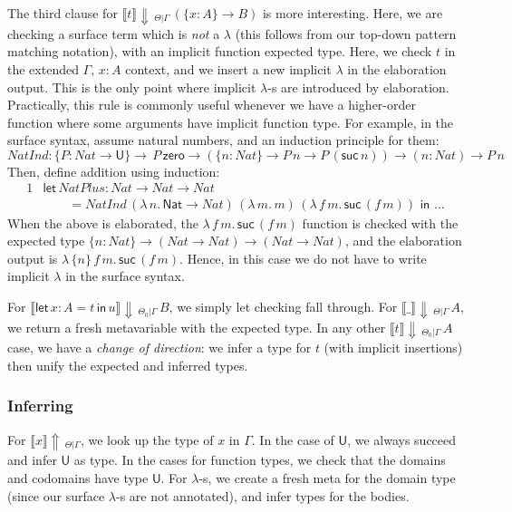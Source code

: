 \documentclass[acmsmall,review,anonymous,prologue,dvipsnames]{acmart}\settopmatter{printfolios=true,printccs=false,printacmref=false}
\newcommand{\slet}{\boldsymbol{\mathsf{let}}}
\renewcommand{\sin}{\boldsymbol{\mathsf{in}}}
\renewcommand{\U}{\mathsf{U}}
\newcommand{\echeck}[4]{\llbracket#1\rrbracket\!\Downarrow\,_{#2|#3}\,#4}
\newcommand{\einfer}[3]{\llbracket#1\rrbracket\!\Uparrow\,_{#2|#3}}
\newcommand{\Nat}{\mathsf{Nat}}
\newcommand{\zero}{\mathsf{zero}}
\newcommand{\suc}{\mathsf{suc}}
\theoremstyle{remark}
\begin{document}
The third clause for $\echeck{t}{\Theta}{\Gamma}{(\{x : A\}\to B)}$ is more
interesting. Here, we are checking a surface term which is \emph{not} a
$\lambda$ (this follows from our top-down pattern matching notation), with an
implicit function expected type. Here, we check $t$ in the extended $\Gamma,\,x
: A$ context, and we insert a new implicit $\lambda$ in the elaboration
output. This is the only point where implicit $\lambda$-s are introduced by
elaboration. Practically, this rule is commonly useful whenever we have a
higher-order function where some arguments have implicit function type. For
example, in the surface syntax, assume natural numbers, and an induction
principle for them:
\[
NatInd : \{P : Nat \to \U\}\to \,P\,\zero \to (\{n : Nat\}\to P\,n \to
         P\,(\suc\,n)) \to (n : Nat) \to P\,n
\]
Then, define addition using induction:
\begin{alignat*}{1}
& \slet\, NatPlus : Nat \to Nat \to Nat\\
& \qquad = NatInd\,(\lambda\,n.\,\Nat\to Nat)\,(\lambda\,m.\,m)\,
                        (\lambda\,f\,m.\,\suc\,(f\,m))\,\,\sin\,\,...
\end{alignat*}
When the above is elaborated, the $\lambda\,f\,m.\,\suc\,(f\,m)$ function is
checked with the expected type $\{n : Nat\}\to (Nat \to Nat) \to (Nat \to Nat)$,
and the elaboration output is $\lambda\,\{n\}\,f\,m.\,\suc\,(f\,m)$.  Hence, in
this case we do not have to write implicit $\lambda$ in the surface syntax.

For $\echeck{\slet\,x:A=t\,\sin\,u}{\Theta_0}{\Gamma}{B}$, we simply let
checking fall through. For $\echeck{\_}{\Theta}{\Gamma}{A}$, we return a fresh
metavariable with the expected type. In any other
$\echeck{t}{\Theta_0}{\Gamma}{A}$ case, we have a \emph{change of direction}: we
infer a type for $t$ (with implicit insertions) then unify the expected and
inferred types.

\subsubsection{Inferring}

For $\einfer{x}{\Theta}{\Gamma}$, we look up the type of $x$ in $\Gamma$. In the
case of $\U$, we always succeed and infer $\U$ as type. In the cases for
function types, we check that the domains and codomains have type $\U$.  For
$\lambda$-s, we create a fresh meta for the domain type (since our surface
$\lambda$-s are not annotated), and infer types for the bodies.
\end{document}
